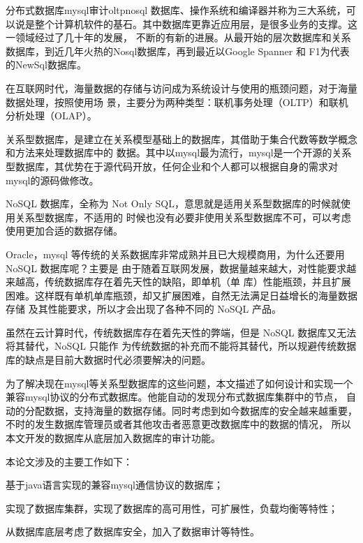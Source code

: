 
\begin{Cabstract}{分布式数据库}{mysql}{审计}{oltp}{nosql}
数据库、操作系统和编译器并称为三大系统，可以说是整个计算机软件的基石。其中数据库更靠近应用层，是很多业务的支撑。这一领域经过了几十年的发展，
不断的有新的进展。从最开始的层次数据库和关系数据库，到近几年火热的Nosql数据库，再到最近以Google Spanner 和 F1为代表的NewSql数据库。

在互联网时代，海量数据的存储与访问成为系统设计与使用的瓶颈问题，对于海量数据处理，按照使用场
景，主要分为两种类型：联机事务处理（OLTP）和联机分析处理（OLAP）。

关系型数据库，是建立在关系模型基础上的数据库，其借助于集合代数等数学概念和方法来处理数据库中的
数据。其中以mysql最为流行，mysql是一个开源的关系型数据库，其优势在于源代码开放，任何企业和个人都可以根据自身的需求对mysql的源码做修改。

NoSQL 数据库，全称为 Not Only SQL，意思就是适用关系型数据库的时候就使用关系型数据库，不适用的
时候也没有必要非使用关系型数据库不可，可以考虑使用更加合适的数据存储。

Oracle，mysql 等传统的关系数据库非常成熟并且已大规模商用，为什么还要用 NoSQL 数据库呢？主要是
由于随着互联网发展，数据量越来越大，对性能要求越来越高，传统数据库存在着先天性的缺陷，即单机（单
库）性能瓶颈，并且扩展困难。这样既有单机单库瓶颈，却又扩展困难，自然无法满足日益增长的海量数据存储
及其性能要求，所以才会出现了各种不同的 NoSQL 产品。

虽然在云计算时代，传统数据库存在着先天性的弊端，但是 NoSQL 数据库又无法将其替代，NoSQL 只能作
为传统数据的补充而不能将其替代，所以规避传统数据库的缺点是目前大数据时代必须要解决的问题。

为了解决现在mysql等关系型数据库的这些问题，本文描述了如何设计和实现一个兼容mysql协议的分布式数据库。他能自动的发现分布式数据库集群中的节点，
自动的分配数据，支持海量的数据存储。同时考虑到如今数据库的安全越来越重要，不时的发生数据库管理员或者其他攻击者恶意更改数据库中的数据的情况，
所以本文开发的数据库从底层加入数据库的审计功能。

本论文涉及的主要工作如下：

基于java语言实现的兼容mysql通信协议的数据库；

实现了数据库集群，实现了数据库的高可用性，可扩展性，负载均衡等特性；

从数据库底层考虑了数据库安全，加入了数据审计等特性。
\end{Cabstract}

